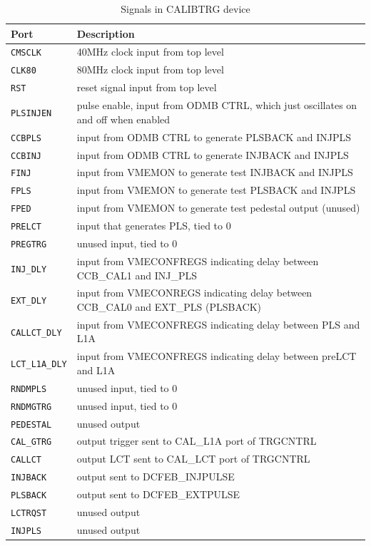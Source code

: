\documentclass[10pt,a4paper]{article}
\begin{document}
\begin{table}[H]
\begin{tabular}{|l|l|} \hline
Port& Description\\ \hline
\texttt{CMSCLK}& 40MHz clock input from top level\\ \hline
\texttt{CLK80}& 80MHz clock input from top level\\ \hline
\texttt{RST}& reset signal input from top level\\ \hline
\texttt{PLSINJEN}& pulse enable, input from ODMB CTRL, which just oscillates on and off when enabled\\ \hline
\texttt{CCBPLS}& input from ODMB CTRL to generate PLSBACK and INJPLS\\ \hline
\texttt{CCBINJ}& input from ODMB CTRL to generate INJBACK and INJPLS\\ \hline
\texttt{FINJ}& input from VMEMON to generate test INJBACK and INJPLS\\ \hline
\texttt{FPLS}& input from VMEMON to generate test PLSBACK and INJPLS\\ \hline
\texttt{FPED}& input from VMEMON to generate test pedestal output (unused)\\ \hline
\texttt{PRELCT}& input that generates PLS, tied to 0\\ \hline
\texttt{PREGTRG}& unused input, tied to 0\\ \hline
\texttt{INJ\_DLY}& input from VMECONFREGS indicating delay between CCB\_CAL1 and INJ\_PLS\\ \hline
\texttt{EXT\_DLY}& input from VMECONREGS indicating delay between CCB\_CAL0 and EXT\_PLS (PLSBACK)\\ \hline
\texttt{CALLCT\_DLY}& input from VMECONFREGS indicating delay between PLS and L1A\\ \hline
\texttt{LCT\_L1A\_DLY}& input from VMECONFREGS indicating delay between preLCT and L1A\\ \hline
\texttt{RNDMPLS}& unused input, tied to 0\\ \hline
\texttt{RNDMGTRG}& unused input, tied to 0\\ \hline
\texttt{PEDESTAL}& unused output\\ \hline
\texttt{CAL\_GTRG}& output trigger sent to CAL\_L1A port of TRGCNTRL\\ \hline
\texttt{CALLCT}& output LCT sent to CAL\_LCT port of TRGCNTRL\\ \hline
\texttt{INJBACK}& output sent to DCFEB\_INJPULSE\\ \hline
\texttt{PLSBACK}& output sent to DCFEB\_EXTPULSE\\ \hline
\texttt{LCTRQST}& unused output\\ \hline
\texttt{INJPLS}& unused output\\ \hline
\end{tabular}
\caption{Signals in CALIBTRG device}
\label{tab:calibtriginterface}
\end{table}
\end{document}
